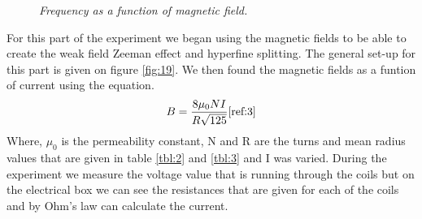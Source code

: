 \documentclass[twocolumn]{article}
\begin{document}
\begin{figure}
\begin{minipage}[t]{0.45\textwidth}
\caption{\textit{Frequency as a function of magnetic field.}}
\label{fig:21}
\end{minipage}
\end{figure}
For this part of the experiment we began using the magnetic fields to be able 
to create the weak field Zeeman effect and hyperfine splitting. The general 
set-up for this part is given on figure \ref{fig:19}. We then found the 
magnetic fields as a funtion of current using the equation.
\begin{equation}
B = \frac{8\mu_0 NI}{R\sqrt{125}}
\label{eqn:21}
\cite{ref:3}
\end{equation}
Where, $\mu_0$ is the permeability constant, N and R are the turns and mean 
radius values that are given in table \ref{tbl:2} and \ref{tbl:3} and I was 
varied. During the experiment we measure the voltage value that is running 
through the coils but on the electrical box we can see the resistances that 
are given for each of the coils and by Ohm's law can calculate the current.
\end{document}
